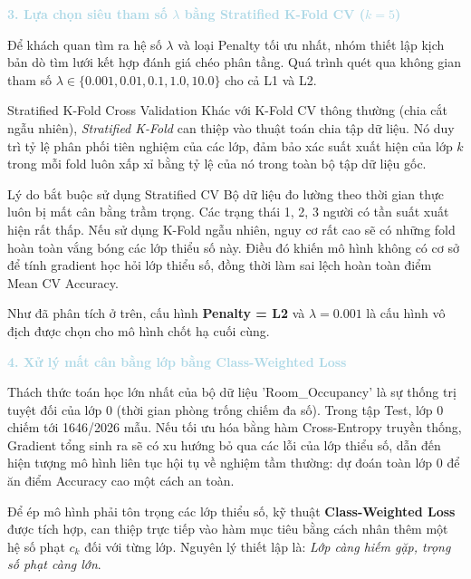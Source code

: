 \vspace{0.5em}
\noindent\textcolor{lightblue}{\textbf{3. Lựa chọn siêu tham số $\lambda$ bằng Stratified K-Fold CV ($k=5$)}}
\vspace{0.5em}

Để khách quan tìm ra hệ số $\lambda$ và loại Penalty tối ưu nhất, nhóm thiết lập kịch bản dò tìm lưới kết hợp đánh giá chéo phân tầng. Quá trình quét qua không gian tham số $\lambda \in \{0.001, 0.01, 0.1, 1.0, 10.0\}$ cho cả L1 và L2.

\begin{infobox}{Stratified K-Fold Cross Validation}
Khác với K-Fold CV thông thường (chia cắt ngẫu nhiên), \textit{Stratified K-Fold} can thiệp vào thuật toán chia tập dữ liệu. Nó duy trì tỷ lệ phân phối tiên nghiệm của các lớp, đảm bảo xác suất xuất hiện của lớp $k$ trong mỗi fold luôn xấp xỉ bằng tỷ lệ của nó trong toàn bộ tập dữ liệu gốc.
\end{infobox}

\begin{warningbox}{Lý do bắt buộc sử dụng Stratified CV}
Bộ dữ liệu đo lường theo thời gian thực luôn bị mất cân bằng trầm trọng. Các trạng thái 1, 2, 3 người có tần suất xuất hiện rất thấp. Nếu sử dụng K-Fold ngẫu nhiên, nguy cơ rất cao sẽ có những fold hoàn toàn vắng bóng các lớp thiểu số này. Điều đó khiến mô hình không có cơ sở để tính gradient học hỏi lớp thiểu số, đồng thời làm sai lệch hoàn toàn điểm Mean CV Accuracy.
\end{warningbox}

Như đã phân tích ở trên, cấu hình \textbf{Penalty = L2} và \textbf{$\lambda = 0.001$} là cấu hình vô địch được chọn cho mô hình chốt hạ cuối cùng.

\vspace{0.5em}
\noindent\textcolor{lightblue}{\textbf{4. Xử lý mất cân bằng lớp bằng Class-Weighted Loss}}
\vspace{0.5em}

Thách thức toán học lớn nhất của bộ dữ liệu 'Room\_Occupancy' là sự thống trị tuyệt đối của lớp $0$ (thời gian phòng trống chiếm đa số). Trong tập Test, lớp 0 chiếm tới 1646/2026 mẫu. Nếu tối ưu hóa bằng hàm Cross-Entropy truyền thống, Gradient tổng sinh ra sẽ có xu hướng bỏ qua các lỗi của lớp thiểu số, dẫn đến hiện tượng mô hình liên tục hội tụ về nghiệm tầm thường: dự đoán toàn lớp 0 để ăn điểm Accuracy cao một cách an toàn.

Để ép mô hình phải tôn trọng các lớp thiểu số, kỹ thuật \textbf{Class-Weighted Loss} được tích hợp, can thiệp trực tiếp vào hàm mục tiêu bằng cách nhân thêm một hệ số phạt $c_k$ đối với từng lớp. Nguyên lý thiết lập là: \textit{Lớp càng hiếm gặp, trọng số phạt càng lớn}.

